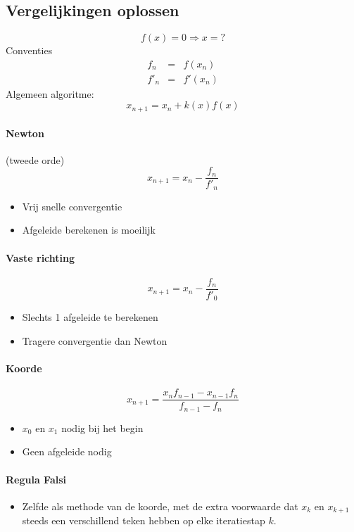 
\subsection{Vergelijkingen oplossen}
\label{sec:NAVgln}
\[
 f(x) = 0 \Rightarrow x = ?
\]
Conventies
\begin{eqnarray*}
  f_n &=& f(x_n)\\
  f'_n &=& f'(x_n)
\end{eqnarray*}
Algemeen algoritme:
\[
  x_{n+1} = x_n + k(x)f(x)
\]

\paragraph{Newton} (tweede orde)
\[
  x_{n+1} = x_n - \frac{f_n}{f'_n}
\]
\begin{itemize}
  \item[\pro] Vrij snelle convergentie
  \item[\con] Afgeleide berekenen is moeilijk
\end{itemize}


\paragraph{Vaste richting}
\[
 x_{n+1} = x_n - \frac{f_n}{f'_0}
\]
\begin{itemize}
 \item[\pro] Slechts 1 afgeleide te berekenen
 \item[\con] Tragere convergentie dan Newton
\end{itemize}

\paragraph{Koorde}
\[
 x_{n+1} = \frac{x_nf_{n-1} - x_{n-1}f_n}{f_{n-1} - f_n}
\]
\begin{itemize}
  \item[\warn] $x_0$ en $x_1$ nodig bij het begin
  \item[\pro] Geen afgeleide nodig
\end{itemize}


\paragraph{Regula Falsi}
\begin{itemize}
  \item[\warn] Zelfde als methode van de koorde, met de extra voorwaarde dat $x_{k}$ en $x_{k+1}$ steeds een verschillend teken hebben op elke iteratiestap $k$.
\end{itemize}


